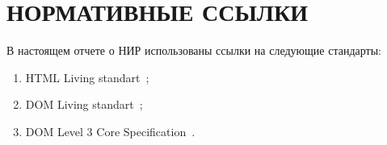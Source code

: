 \section*{НОРМАТИВНЫЕ ССЫЛКИ}

В настоящем отчете о НИР использованы ссылки на следующие стандарты:

\begin{enumerate}[label=\arabic*)]
	\item HTML Living standart~\cite{html-doc};
	\item DOM Living standart~\cite{dom-doc};
	\item DOM Level 3 Core Specification~\cite{not-dynamic}.
	
\end{enumerate}

\pagebreak